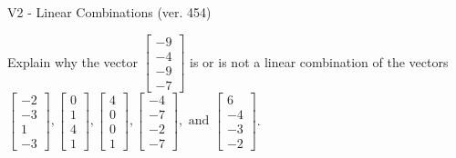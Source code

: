 \begin{exercise}
  \begin{exerciseTitle}V2 - Linear Combinations (ver. 454)\end{exerciseTitle}
  \begin{exerciseStatement}
    Explain why the vector \(\left[\begin{array}{c}
-9 \\
-4 \\
-9 \\
-7
\end{array}\right]\)  is or is not a linear 
	combination of the vectors \(\left[\begin{array}{c}
-2 \\
-3 \\
1 \\
-3
\end{array}\right] , \left[\begin{array}{c}
0 \\
1 \\
4 \\
1
\end{array}\right] , \left[\begin{array}{c}
4 \\
0 \\
0 \\
1
\end{array}\right] , \left[\begin{array}{c}
-4 \\
-7 \\
-2 \\
-7
\end{array}\right] , \text{ and } \left[\begin{array}{c}
6 \\
-4 \\
-3 \\
-2
\end{array}\right]\).
	



\end{exerciseStatement}
\end{exercise}
